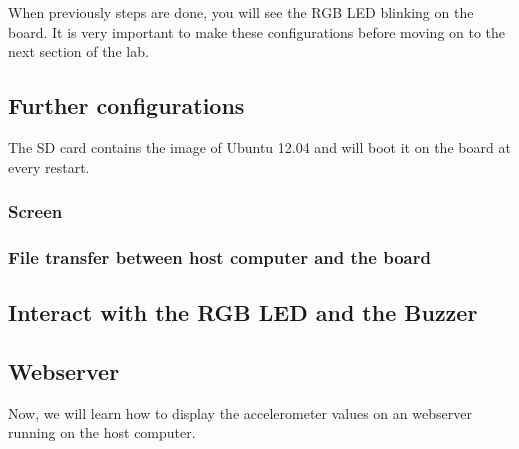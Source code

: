 When previously steps are done, you will see the RGB LED blinking on the board. It is very
important to make these configurations before moving on to the next section of the lab.

\subsection{Further configurations}

The SD card contains the image of Ubuntu 12.04 and will boot it on the board at every restart.

\subsubsection{Screen}

\subsubsection{File transfer between host computer and the board}




\subsection{Interact with the RGB LED and the Buzzer}




\subsection{Webserver}
Now, we will learn how to display the accelerometer values on an webserver running
on the host computer.






